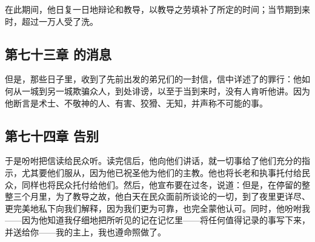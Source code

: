 在此期间，他日复一日地辩论和教导，以教导之劳填补了所定的时间；当节期到来时，超过一万人受了洗。\par


\subsection{第七十三章 的消息}

但是，那些日子里，收到了先前出发的弟兄们的一封信，信中详述了的罪行：他如何从一城到另一城欺骗众人，到处诽谤，以至于当到来时，没有人肯听他讲。因为他断言是术士、不敬神的人、有害、狡猾、无知，并声称不可能的事。\par


\subsection{第七十四章 告别}

于是吩咐把信读给民众听。读完信后，他向他们讲话，就一切事给了他们充分的指示，尤其要他们服从，因为他已祝圣他为他们的主教。他也将长老和执事托付给民众，同样也将民众托付给他们。然后，他宣布要在过冬，说道：但是，在停留的整整三个月里，为了教导之故，他白天在民众面前所谈论的一切，到了夜里更详尽、更完美地私下向我们解释，因为我们更为可靠，也完全蒙他认可。同时，他吩咐我——因为他知道我仔细地把所听见的记在记忆里——将任何值得记录的事写下来，并送给你——我的主上，我也遵命照做了。\par


